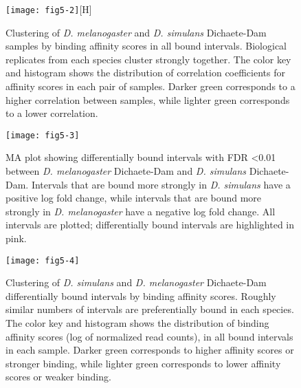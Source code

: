 \begin{figure}
\centering
\texttt{[image: fig5-2]}[H]
\caption{Clustering of \emph{D. melanogaster} and \emph{D. simulans} Dichaete-Dam samples by binding affinity scores in all bound intervals. Biological replicates from each species cluster strongly together. The color key and histogram shows the distribution of correlation coefficients for affinity scores in each pair of samples. Darker green corresponds to a higher correlation between samples, while lighter green corresponds to a lower correlation.}
\label{Figure 5.2}
\end{figure}

\begin{figure}
\centering
\texttt{[image: fig5-3]}
\caption{MA plot showing differentially bound intervals with FDR \textless 0.01 between \emph{D. melanogaster} Dichaete-Dam and \emph{D. simulans} Dichaete-Dam. Intervals that are bound more strongly in \emph{D. simulans} have a positive log fold change, while intervals that are bound more strongly in \emph{D. melanogaster} have a negative log fold change. All intervals are plotted; differentially bound intervals are highlighted in pink.}
\label{Figure 5.3}
\end{figure}

\begin{figure}
\centering
\texttt{[image: fig5-4]}
\caption{Clustering of \emph{D. simulans} and \emph{D. melanogaster} Dichaete-Dam differentially bound intervals by binding affinity scores. Roughly similar numbers of intervals are preferentially bound in each species. The color key and histogram shows the distribution of binding affinity scores (log of normalized read counts), in all bound intervals in each sample. Darker green corresponds to higher affinity scores or stronger binding, while lighter green corresponds to lower affinity scores or weaker binding.}
\label{Figure 5.4}
\end{figure}

